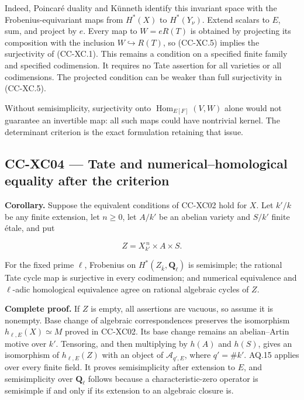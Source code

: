Indeed, Poincaré duality and Künneth identify this invariant space with
the Frobenius-equivariant maps from \(H^*(X)\) to \(H^*(Y_\nu)\). Extend
scalars to \(E\), sum, and project by \(e\). Every map to \(W=eR(T)\) is
obtained by projecting its composition with the inclusion
\(W\hookrightarrow R(T)\), so (CC-XC.5) implies the surjectivity of
(CC-XC.1). This remains a condition on a specified finite family and
specified codimension. It requires no Tate assertion for all varieties
or all codimensions. The projected condition can be weaker than full
surjectivity in (CC-XC.5).

Without semisimplicity, surjectivity onto
\(\operatorname{Hom}_{E[F]}(V,W)\) alone would not guarantee an
invertible map: all such maps could have nontrivial kernel. The
determinant criterion is the exact formulation retaining that issue.

\subsection{CC-XC04 --- Tate and numerical--homological equality after
the
criterion}\label{cc-xc04-tate-and-numericalhomological-equality-after-the-criterion}

\textbf{Corollary.} Suppose the equivalent conditions of CC-XC02 hold
for \(X\). Let \(k'/k\) be any finite extension, let \(n\ge0\), let
\(A/k'\) be an abelian variety and \(S/k'\) finite étale, and put

\[
 Z=X_{k'}^{\,n}\times A\times S.
\]

For the fixed prime \(\ell\), Frobenius on
\(H^*(Z_{\bar k},\mathbf Q_\ell)\) is semisimple; the rational Tate
cycle map is surjective in every codimension; and numerical equivalence
and \(\ell\)-adic homological equivalence agree on rational algebraic
cycles of \(Z\).

\textbf{Complete proof.} If \(Z\) is empty, all assertions are vacuous,
so assume it is nonempty. Base change of algebraic correspondences
preserves the isomorphism \(h_{\ell,E}(X)\simeq M\) proved in CC-XC02.
Its base change remains an abelian--Artin motive over \(k'\). Tensoring,
and then multiplying by \(h(A)\) and \(h(S)\), gives an isomorphism of
\(h_{\ell,E}(Z)\) with an object of \(\mathcal A_{q',E}\), where
\(q'=\#k'\). AQ.15 applies over every finite field. It proves
semisimplicity after extension to \(E\), and semisimplicity over
\(\mathbf Q_\ell\) follows because a characteristic-zero operator is
semisimple if and only if its extension to an algebraic closure is.

